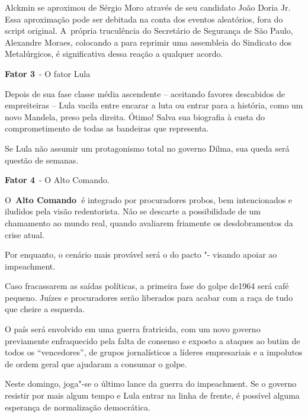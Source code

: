 Alckmin se aproximou de Sérgio Moro através de seu candidato João Doria
Jr. Essa aproximação pode ser debitada na conta dos eventos aleatórios,
fora do script original. A~própria truculência do Secretário de
Segurança de São Paulo, Alexandre Moraes, colocando a  para reprimir
uma assembleia do Sindicato dos Metalúrgicos, é significativa dessa
reação a qualquer acordo.

\textbf{Fator 3}~- O fator Lula

Depois de sua fase classe média ascendente -- aceitando favores
descabidos de empreiteiras -- Lula vacila entre encarar a luta ou entrar
para a história, como um novo Mandela, preso pela direita. Ótimo! Salva
sua biografia à custa do comprometimento de todas as bandeiras que
representa.

Se Lula não assumir um protagonismo total no governo Dilma, sua queda
será questão de semanas.

\textbf{Fator 4}~- O Alto Comando.

O~\textbf{Alto Comando~}é integrado por procuradores probos, bem
intencionados e iludidos pela visão redentorista. Nâo se descarte a
possibilidade de um chamamento ao mundo real, quando avaliarem friamente
os desdobramentos da crise atual.

Por enquanto, o cenário mais provável será o do pacto "- visando
apoiar ao impeachment.

Caso fracassarem as saídas políticas, a primeira fase do golpe de1964
será café pequeno. Juízes e procuradores serão liberados para acabar com
a raça de tudo que cheire a esquerda.

O país será envolvido em uma guerra fratricida, com um novo governo
previamente enfraquecido pela falta de consenso e exposto a ataques ao
butim de todos os ``vencedores'', de grupos jornalísticos a líderes
empresariais e a impolutos de ordem geral que ajudaram a consumar o
golpe.

Neste domingo, joga"-se o último lance da guerra do impeachment. Se o
governo resistir por mais algum tempo e Lula entrar na linha de frente,
é possível alguma esperança de normalização democrática.

 

 
